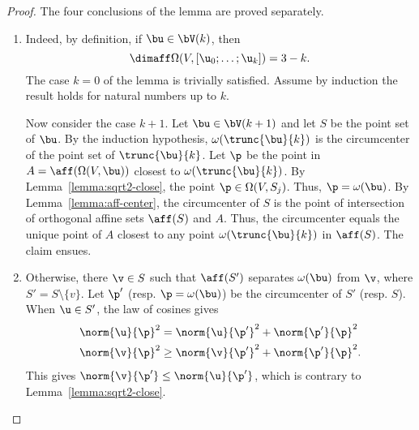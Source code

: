 \begin{proof} The four conclusions of the lemma  are proved
separately.

\begin{enumerate}
\item {}
  Indeed, by definition, if $\bu\in \bV(k)$, then
\[  
\dimaff\Omega(V,[\u_0;\ldots;\u_k]) = 3-k.
\]   
The case $k=0$ of the lemma is trivially satisfied.  Assume by
induction the result holds for natural numbers up to $k$.

Now consider the case $k+1$.  Let $\bu\in \bV(k+1)$ and let $S$ be
the point set of $\bu$.  By the induction hypothesis,
$\omega(\trunc{\bu}{k})$ is the circumcenter of the point set of
$\trunc{\bu}{k}$.  Let $\p$ be the point in
$A=\aff(\Omega(V,\bu))$ closest to $\omega(\trunc{\bu}{k})$.  By
Lemma~\ref{lemma:sqrt2-close}, the point $\p\in\Omega(V,S_{j})$.
Thus, $\p=\omega(\bu)$.  By Lemma~\ref{lemma:aff-center}, the
circumcenter of $S$ is the point of intersection of orthogonal affine
sets $\aff(S)$ and $A$.  Thus, the circumcenter equals the unique
point of $A$ closest to any point $\omega(\trunc{\bu}{k})$ in
$\aff(S)$.  The claim ensues.



\item{}  Otherwise, there
  $\v\in S$ such that $\aff(S')$ separates $\omega(\bu)$ from $ \v$,
  where $S'=S\setminus\{v\}$.  Let $\p'$ (resp. $\p=\omega(\bu)$) be
  the circumcenter of $S'$ (resp. $S$).  When $\u\in S'$, the law of
  cosines gives
\begin{align*} 
\norm{ \u}{\p}^2 &= \norm{\u}{\p'}^2 + \norm{\p'}{\p}^2\\ 
\norm{ \v}{\p}^2 &\ge \norm{\v}{\p'}^2 + \norm{\p'}{\p}^2.
\end{align*}
This gives $\norm{\v}{\p'}\le \norm{\u}{\p'}$, which is contrary to
Lemma~\ref{lemma:sqrt2-close}.


\end{enumerate}
\end{proof}
